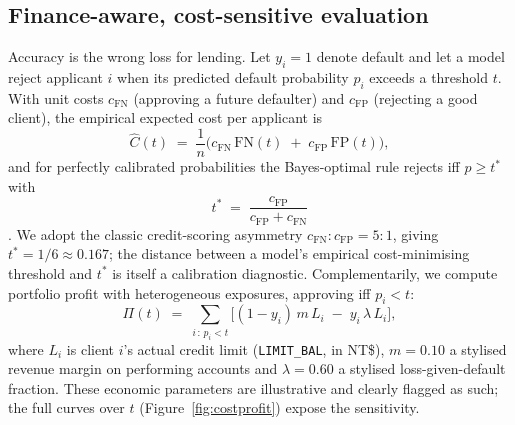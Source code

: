\documentclass[11pt]{article}
\begin{document}
\subsection{Finance-aware, cost-sensitive evaluation}
Accuracy is the wrong loss for lending. Let $y_i = 1$ denote default and let
a model reject applicant $i$ when its predicted default probability $p_i$
exceeds a threshold $t$. With unit costs $c_{\mathrm{FN}}$ (approving a
future defaulter) and $c_{\mathrm{FP}}$ (rejecting a good client), the
empirical expected cost per applicant is
\begin{equation}
\widehat{C}(t) \;=\; \frac{1}{n}\Big( c_{\mathrm{FN}} \,\mathrm{FN}(t)
 \;+\; c_{\mathrm{FP}} \,\mathrm{FP}(t) \Big),
\label{eq:cost}
\end{equation}
and for perfectly calibrated probabilities the Bayes-optimal rule rejects iff
$p \ge t^\ast$ with
\begin{equation}
t^\ast \;=\; \frac{c_{\mathrm{FP}}}{c_{\mathrm{FP}} + c_{\mathrm{FN}}}
\label{eq:bayes}
\end{equation}
\cite{elkan2001}. We adopt the classic credit-scoring asymmetry
$c_{\mathrm{FN}} : c_{\mathrm{FP}} = 5 : 1$, giving $t^\ast = 1/6 \approx
0.167$; the distance between a model's empirical cost-minimising threshold
and $t^\ast$ is itself a calibration diagnostic. Complementarily, we compute
portfolio profit with heterogeneous exposures, approving iff $p_i < t$:
\begin{equation}
\Pi(t) \;=\; \sum_{i\,:\,p_i < t} \Big[ (1-y_i)\, m\, L_i \;-\; y_i\,
\lambda\, L_i \Big],
\label{eq:profit}
\end{equation}
where $L_i$ is client $i$'s actual credit limit (\texttt{LIMIT\_BAL}, in
NT\$), $m = 0.10$ a stylised revenue margin on performing accounts and
$\lambda = 0.60$ a stylised loss-given-default fraction. These economic
parameters are illustrative and clearly flagged as such; the full curves over
$t$ (Figure~\ref{fig:costprofit}) expose the sensitivity.
\end{document}

